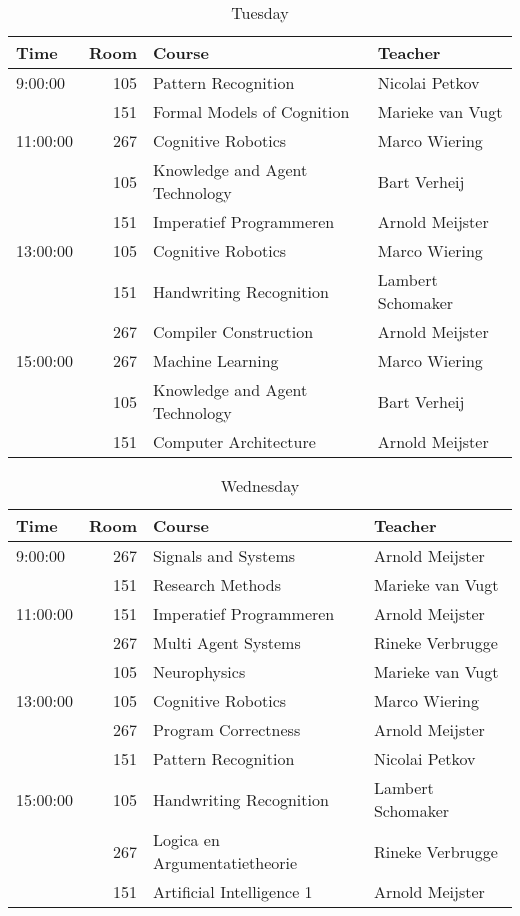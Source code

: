 \begin{table}[h]
    \centering
    \caption{Tuesday}
    \begin{tabular}{l|r|l|l}
        Time & Room & Course & Teacher \\ \hline
        \hline
        9:00:00 & 105 & Pattern Recognition & Nicolai Petkov\\
        & 151 & Formal Models of Cognition & Marieke van Vugt\\\hline
        11:00:00 & 267 & Cognitive Robotics & Marco Wiering\\
        & 105 & Knowledge and Agent Technology & Bart Verheij\\
        & 151 & Imperatief Programmeren & Arnold Meijster\\\hline
        13:00:00 & 105 & Cognitive Robotics & Marco Wiering\\
        & 151 & Handwriting Recognition & Lambert Schomaker\\
        & 267 & Compiler Construction & Arnold Meijster\\\hline
        15:00:00 & 267 & Machine Learning & Marco Wiering\\
        & 105 & Knowledge and Agent Technology & Bart Verheij\\
        & 151 & Computer Architecture & Arnold Meijster\\
    \end{tabular}
\end{table}

\begin{table}[h]
    \centering
    \caption{Wednesday}
    \begin{tabular}{l|r|l|l}
        Time & Room & Course & Teacher \\ \hline
        \hline
        9:00:00 & 267 & Signals and Systems & Arnold Meijster\\
        & 151 & Research Methods & Marieke van Vugt\\\hline
        11:00:00 & 151 & Imperatief Programmeren & Arnold Meijster\\
        & 267 & Multi Agent Systems & Rineke Verbrugge\\
        & 105 & Neurophysics & Marieke van Vugt\\\hline
        13:00:00 & 105 & Cognitive Robotics & Marco Wiering\\
        & 267 & Program Correctness & Arnold Meijster\\
        & 151 & Pattern Recognition & Nicolai Petkov\\\hline
        15:00:00 & 105 & Handwriting Recognition & Lambert Schomaker\\
        & 267 & Logica en Argumentatietheorie & Rineke Verbrugge\\
        & 151 & Artificial Intelligence 1 & Arnold Meijster\\
    \end{tabular}
\end{table}

